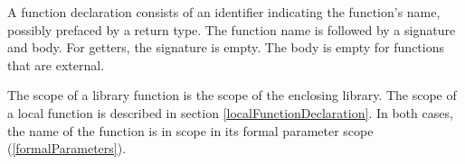 \documentclass{article}
\newcommand{\code}[1]{{\sf #1}}
\begin{document}
\LMHash{}
A function declaration consists of an identifier indicating the function's name, possibly prefaced by a return type. The function name is followed by a signature and body. For getters, the signature  is empty. The body is empty for functions that are external.

\LMHash{}
The scope of a library function is the scope of the enclosing library. The scope of a local function is  described in section \ref{localFunctionDeclaration}. In both cases, the name of the function is in scope in its formal parameter scope (\ref{formalParameters}).






\end{document}
